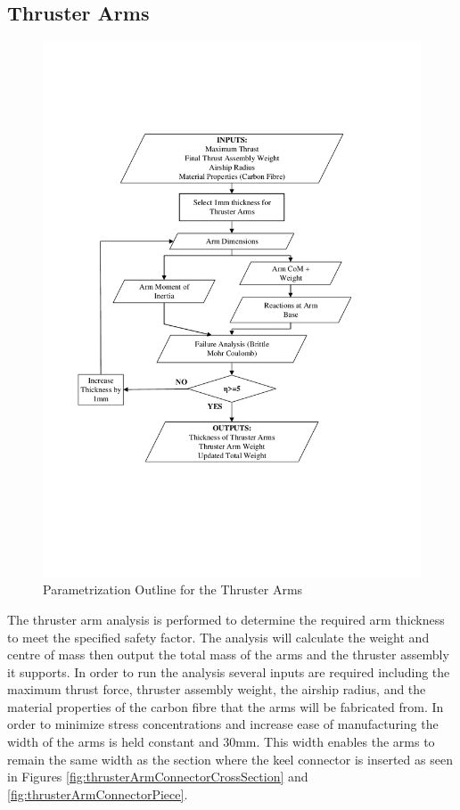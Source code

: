 \documentclass[../main.tex]{subfiles}
\begin{document}
\subsection{Thruster Arms} \label{thrustArms}

\begin{figure}[H]
	\centering
	\includegraphics[width=.9\linewidth]{img/paramaterization/thrusterArms.pdf}
	\caption{Parametrization Outline for the Thruster Arms}
	\label{fig:thrusterArmsParametrization}
\end{figure}

The thruster arm analysis is performed to determine the required arm thickness to meet the specified safety factor. The analysis will calculate the weight and centre of mass then output the total mass of the arms and the thruster assembly it supports. In order to run the analysis several inputs are required including the maximum thrust force, thruster assembly weight, the airship radius, and the material properties of the carbon fibre that the arms will be fabricated from. In order to minimize stress concentrations and increase ease of manufacturing the width of the arms is held constant and 30mm. This width enables the arms to remain the same width as the section where the keel connector is inserted as seen in Figures \ref{fig:thrusterArmConnectorCrossSection} and \ref{fig:thrusterArmConnectorPiece}.\\
\end{document}
